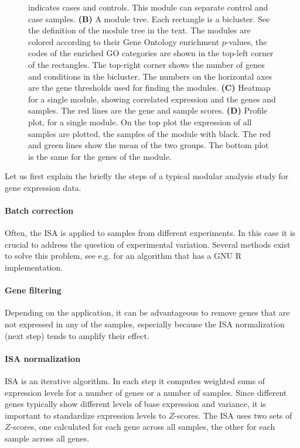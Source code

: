 \documentclass{bioinfo}
\newcommand{\subfig}[1]{\textbf{#1}}
\begin{document}
\begin{figure}
{  indicates cases and controls. This module can separate control and
  case samples.
  \subfig{(B)} A module tree. Each rectangle is a bicluster. See the
  definition of the module tree in the text. The modules are colored
  according to their Gene Ontology enrichment $p$-values, the codes of
  the enriched GO categories are shown in the top-left corner of the
  rectangles. The top-right corner shows the number of genes and
  conditions in the bicluster. The numbers on the horizontal axes are
  the gene thresholds used for finding the modules.
  \subfig{(C)} Heatmap for a single module, showing correlated
  expression and the genes and samples. The red lines are the gene and
  sample scores.
  \subfig{(D)} Profile plot, for a single module. On the top plot the
  expression of all samples are plotted, the samples of the module
  with black. The red and green lines show the mean of the two
  groups. The bottom plot is the same for the genes of the module.
}
\label{fig:workflow}
\end{figure}

Let us first explain the briefly the steps of a typical modular
analysis study for gene expression data.

\paragraph{Batch correction}
Often, the ISA is applied to samples from different experiments. In
this case it is crucial to address the question of experimental
variation. Several methods exist to solve this problem,
see e.g. \cite{johnson07} for an algorithm that has a GNU R
implementation.

\paragraph{Gene filtering}
Depending on the application, it can be advantageous to remove genes
that are not expressed in any of the samples, especially because the
ISA normalization (next step) tends to amplify their effect.

\paragraph{ISA normalization}
ISA is an iterative algorithm. In each step it computes weighted sums
of expression levels for a number of genes or a number of
samples. Since different genes typically show different levels of base
expression and variance, it is important to standardize expression
levels to $Z$-scores. The ISA uses two sets of $Z$-scores, one
calculated for each gene across all samples, the other for each sample
across all genes.
\end{document}
